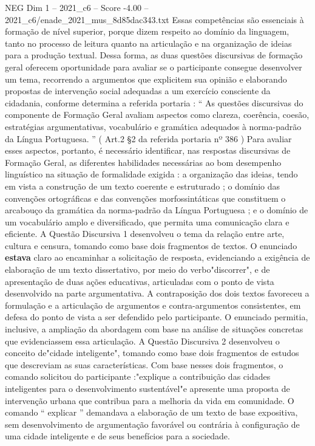 \begin{textsample}{NEG Dim 1 – 2021\_c6 – Score -4.00 – 2021\_c6/enade\_2021\_mus\_8d85dac343.txt}
Essas competências são essenciais à formação de nível superior, porque dizem respeito ao domínio da linguagem, tanto no processo de leitura quanto na articulação e na organização de ideias para a produção textual.
Dessa forma, as duas questões discursivas de formação geral oferecem oportunidade para avaliar se o participante consegue desenvolver um tema, recorrendo a argumentos que explicitem sua opinião e elaborando propostas de intervenção social adequadas a um exercício consciente da cidadania, conforme determina a referida portaria : “ As questões discursivas do componente de Formação Geral avaliam aspectos como clareza, coerência, coesão, estratégias argumentativas, vocabulário e gramática adequados à norma-padrão da Língua Portuguesa. ” ( Art.2 §2 da referida portaria nº 386 ) Para avaliar esses aspectos, portanto, é necessário identificar, nas respostas discursivas de Formação Geral, as diferentes habilidades necessárias ao bom desempenho linguístico na situação de formalidade exigida : a organização das ideias, tendo em vista a construção de um texto coerente e estruturado ; o domínio das convenções ortográficas e das convenções morfossintáticas que constituem o arcabouço da gramática da norma-padrão da Língua Portuguesa ; e o domínio de um vocabulário amplo e diversificado, que permita uma comunicação clara e eficiente.
A Questão Discursiva 1 desenvolveu o tema da relação entre arte, cultura e censura, tomando como base dois fragmentos de textos.
O enunciado \textbf{estava} claro ao encaminhar a solicitação de resposta, evidenciando a exigência de elaboração de um texto dissertativo, por meio do verbo"discorrer", e de apresentação de duas ações educativas, articuladas com o ponto de vista desenvolvido na parte argumentativa.
A contraposição dos dois textos favoreceu a formulação e a articulação de argumentos e contra-argumentos consistentes, em defesa do ponto de vista a ser defendido pelo participante.
O enunciado permitia, inclusive, a ampliação da abordagem com base na análise de situações concretas que evidenciassem essa articulação.
A Questão Discursiva 2 desenvolveu o conceito de"cidade inteligente", tomando como base dois fragmentos de estudos que descreviam as suas características.
Com base nesses dois fragmentos, o comando solicitou do participante :"explique a contribuição das cidades inteligentes para o desenvolvimento sustentável"e apresente uma proposta de intervenção urbana que contribua para a melhoria da vida em comunidade.
O comando “ explicar ” demandava a elaboração de um texto de base expositiva, sem desenvolvimento de argumentação favorável ou contrária à configuração de uma cidade inteligente e de seus benefícios para a sociedade.

\end{textsample}
